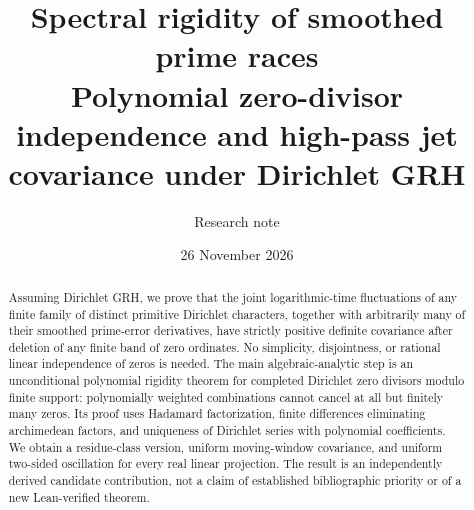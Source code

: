 \documentclass[11pt]{article}
\title{\textbf{Spectral rigidity of smoothed prime races}\\[3pt]\large Polynomial zero-divisor independence and high-pass jet covariance under Dirichlet GRH}
\author{Research note}\date{26 November 2026}
\theoremstyle{remark}\newtheorem{remark}[theorem]{Remark}
\begin{document}
\maketitle
\begin{abstract}
Assuming Dirichlet GRH, we prove that the joint logarithmic-time fluctuations of any finite family of distinct primitive Dirichlet characters, together with arbitrarily many of their smoothed prime-error derivatives, have strictly positive definite covariance after deletion of any finite band of zero ordinates. No simplicity, disjointness, or rational linear independence of zeros is needed. The main algebraic-analytic step is an unconditional polynomial rigidity theorem for completed Dirichlet zero divisors modulo finite support: polynomially weighted combinations cannot cancel at all but finitely many zeros. Its proof uses Hadamard factorization, finite differences eliminating archimedean factors, and uniqueness of Dirichlet series with polynomial coefficients. We obtain a residue-class version, uniform moving-window covariance, and uniform two-sided oscillation for every real linear projection. The result is an independently derived candidate contribution, not a claim of established bibliographic priority or of a new Lean-verified theorem.
\end{abstract}
\end{document}
